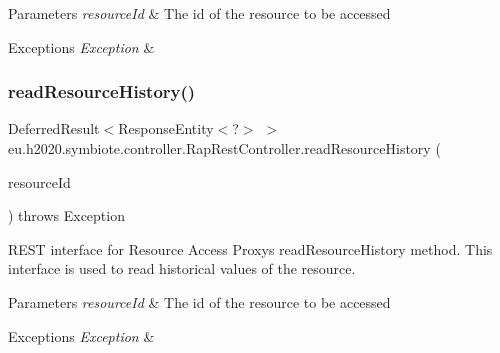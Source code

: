 \begin{DoxyParams}{Parameters}
{\em resource\+Id} & The id of the resource to be accessed \\
\hline
\end{DoxyParams}

\begin{DoxyExceptions}{Exceptions}
{\em Exception} & \\
\hline
\end{DoxyExceptions}
\mbox{\label{classeu_1_1h2020_1_1symbiote_1_1controller_1_1RapRestController_a11fc8b8068e57e32a81b1d3c835cded4}} 
\subsubsection{\texorpdfstring{read\+Resource\+History()}{readResourceHistory()}}
{\footnotesize\ttfamily Deferred\+Result$<$Response\+Entity$<$?$>$ $>$ eu.\+h2020.\+symbiote.\+controller.\+Rap\+Rest\+Controller.\+read\+Resource\+History (\begin{DoxyParamCaption}\item[{@Path\+Variable String}]{resource\+Id }\end{DoxyParamCaption}) throws Exception}

R\+E\+ST interface for Resource Access Proxy\textquotesingle{}s read\+Resource\+History method. This interface is used to read historical values of the resource.


\begin{DoxyParams}{Parameters}
{\em resource\+Id} & The id of the resource to be accessed \\
\hline
\end{DoxyParams}

\begin{DoxyExceptions}{Exceptions}
{\em Exception} & \\
\hline
\end{DoxyExceptions}
\mbox{\label{classeu_1_1h2020_1_1symbiote_1_1controller_1_1RapRestController_a2880be887baef0ec6a60627f7c9dc927}} 
